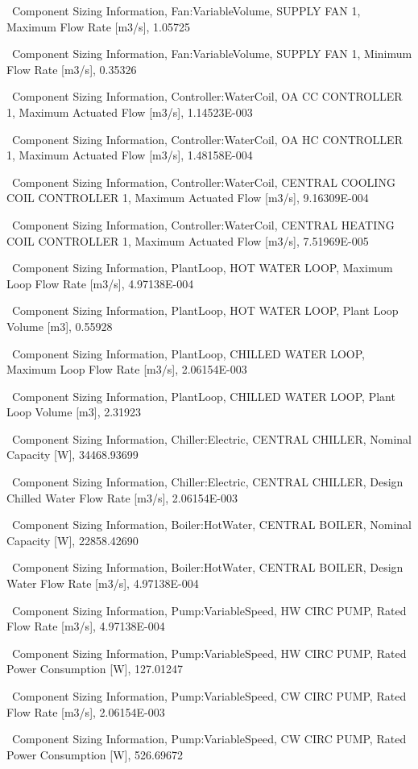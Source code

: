 ~Component Sizing Information, Fan:VariableVolume, SUPPLY FAN 1, Maximum Flow Rate {[}m3/s{]}, 1.05725

~Component Sizing Information, Fan:VariableVolume, SUPPLY FAN 1, Minimum Flow Rate {[}m3/s{]}, 0.35326

~Component Sizing Information, Controller:WaterCoil, OA CC CONTROLLER 1, Maximum Actuated Flow {[}m3/s{]}, 1.14523E-003

~Component Sizing Information, Controller:WaterCoil, OA HC CONTROLLER 1, Maximum Actuated Flow {[}m3/s{]}, 1.48158E-004

~Component Sizing Information, Controller:WaterCoil, CENTRAL COOLING COIL CONTROLLER 1, Maximum Actuated Flow {[}m3/s{]}, 9.16309E-004

~Component Sizing Information, Controller:WaterCoil, CENTRAL HEATING COIL CONTROLLER 1, Maximum Actuated Flow {[}m3/s{]}, 7.51969E-005

~Component Sizing Information, PlantLoop, HOT WATER LOOP, Maximum Loop Flow Rate {[}m3/s{]}, 4.97138E-004

~Component Sizing Information, PlantLoop, HOT WATER LOOP, Plant Loop Volume {[}m3{]}, 0.55928

~Component Sizing Information, PlantLoop, CHILLED WATER LOOP, Maximum Loop Flow Rate {[}m3/s{]}, 2.06154E-003

~Component Sizing Information, PlantLoop, CHILLED WATER LOOP, Plant Loop Volume {[}m3{]}, 2.31923

~Component Sizing Information, Chiller:Electric, CENTRAL CHILLER, Nominal Capacity {[}W{]}, 34468.93699

~Component Sizing Information, Chiller:Electric, CENTRAL CHILLER, Design Chilled Water Flow Rate {[}m3/s{]}, 2.06154E-003

~Component Sizing Information, Boiler:HotWater, CENTRAL BOILER, Nominal Capacity {[}W{]}, 22858.42690

~Component Sizing Information, Boiler:HotWater, CENTRAL BOILER, Design Water Flow Rate {[}m3/s{]}, 4.97138E-004

~Component Sizing Information, Pump:VariableSpeed, HW CIRC PUMP, Rated Flow Rate {[}m3/s{]}, 4.97138E-004

~Component Sizing Information, Pump:VariableSpeed, HW CIRC PUMP, Rated Power Consumption {[}W{]}, 127.01247

~Component Sizing Information, Pump:VariableSpeed, CW CIRC PUMP, Rated Flow Rate {[}m3/s{]}, 2.06154E-003

~Component Sizing Information, Pump:VariableSpeed, CW CIRC PUMP, Rated Power Consumption {[}W{]}, 526.69672

